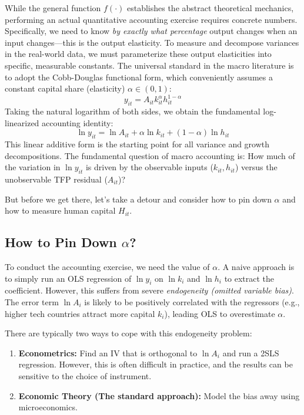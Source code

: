 While the general function $f(\cdot)$ establishes the abstract theoretical mechanics, performing an actual quantitative accounting exercise requires concrete numbers. Specifically, we need to know \textit{by exactly what percentage} output changes when an input changes—this is the output elasticity. To measure and decompose variances in the real-world data, we must parameterize these output elasticities into specific, measurable constants. The universal standard in the macro literature is to adopt the Cobb-Douglas functional form, which conveniently assumes a constant capital share (elasticity) $\alpha \in (0,1)$:
$$
y_{it} = A_{it} k_{it}^{\alpha} h_{it}^{1-\alpha}
$$
Taking the natural logarithm of both sides, we obtain the fundamental log-linearized accounting identity:
$$
\ln y_{it} = \ln A_{it} + \alpha \ln k_{it} + (1-\alpha) \ln h_{it}
$$
This linear additive form is the starting point for all variance and growth decompositions. The fundamental question of macro accounting is: How much of the variation in $\ln y_{it}$ is driven by the observable inputs ($k_{it}, h_{it}$) versus the unobservable TFP residual ($A_{it}$)?

But before we get there, let's take a detour and consider how to pin down $\alpha$ and how to measure human capital $H_{it}$.

\subsection{How to Pin Down $\alpha$?}

To conduct the accounting exercise, we need the value of $\alpha$. A naive approach is to simply run an OLS regression of $\ln y_i$ on $\ln k_i$ and $\ln h_i$ to extract the coefficient. However, this suffers from severe \textit{endogeneity (omitted variable bias)}. The error term $\ln A_i$ is likely to be positively correlated with the regressors (e.g., higher tech countries attract more capital $k_i$), leading OLS to overestimate $\alpha$.

There are typically two ways to cope with this endogeneity problem:
\begin{enumerate}
    \item \textbf{Econometrics:} Find an IV that is orthogonal to $\ln A_i$ and run a 2SLS regression. However, this is often difficult in practice, and the results can be sensitive to the choice of instrument.
    \item \textbf{Economic Theory (The standard approach):} Model the bias away using microeconomics. 
\end{enumerate}

